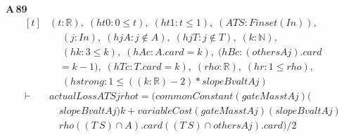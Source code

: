 \noindent\textbf{A\,89}\quad{}
{\footnotesize\[ \begin{aligned}[t]
&(\mathit{t} : \mathbb{R} ),\; (\mathit{ht0} : 0 \leq \mathit{t}),\; (\mathit{ht1} : \mathit{t} \leq 1),\; (\mathit{A} \mathit{T} \mathit{S} : \mathit{Finset} (\mathit{I} \mathit{n})),\\
&\quad \; (\mathit{j} : \mathit{I} \mathit{n}),\; (\mathit{hjA} : \mathit{j} \notin \mathit{A}),\; (\mathit{hjT} : \mathit{j} \notin \mathit{T}),\; (\mathit{k} : \mathbb{N} ),\\
&\quad \; (\mathit{hk} : 3 \leq \mathit{k}),\; (\mathit{hAc} : \mathit{A}.\mathit{card}=\mathit{k}),\; (\mathit{hBc} : (\mathit{others} \mathit{A} \mathit{j}).\mathit{card}\\
&\quad =\mathit{k}-1),\; (\mathit{hTc} : \mathit{T}.\mathit{card}=\mathit{k}),\; (\mathit{rho} : \mathbb{R} ),\; (\mathit{hr} : 1 \leq \mathit{rho}),\\
&\quad \; (\mathit{hstrong} : 1 \leq ((\mathit{k}:\mathbb{R} )-2)*\mathit{slopeBval} \mathit{t} \mathit{A} \mathit{j})\\
\vdash\;&\mathit{actualLoss} \mathit{A} \mathit{T} \mathit{S} \mathit{j} \mathit{rho} \mathit{t} = (\mathit{commonConstant} (\mathit{gateMass} \mathit{t} \mathit{A} \mathit{j}) (\\
&\quad \mathit{slopeBval} \mathit{t} \mathit{A} \mathit{j}) \mathit{k}+ \mathit{variableCost} (\mathit{gateMass} \mathit{t} \mathit{A} \mathit{j}) (\mathit{slopeBval} \mathit{t} \mathit{A} \mathit{j})\\
&\quad \mathit{rho} ((\mathit{T} \ \mathit{S}) \cap \mathit{A}).\mathit{card} ((\mathit{T} \ \mathit{S}) \cap \mathit{others} \mathit{A} \mathit{j}).\mathit{card})/2
\end{aligned} \]}

